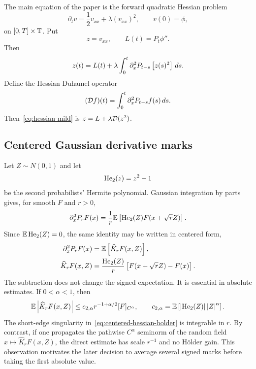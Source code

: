The main equation of the paper is the forward quadratic Hessian problem
\begin{equation}
  \partial_tv
  =
  \frac12v_{xx}+\lambda(v_{xx})^2,
  \qquad
  v(0)=\phi,
  \label{eq:hessian-forward}
\end{equation}
on $[0,T]\times\mathbb T$. Put
\begin{equation*}
  z=v_{xx},
  \qquad
  L(t)=P_t\phi''.
\end{equation*}
Then
\begin{equation}
  z(t)
  =
  L(t)
  +\lambda\int_0^t
  \partial_x^2P_{t-s}\left[z(s)^2\right]\,ds.
  \label{eq:hessian-mild}
\end{equation}
Define the Hessian Duhamel operator
\begin{equation}
  (\mathcal D f)(t)
  =
  \int_0^t\partial_x^2P_{t-s}f(s)\,ds.
  \label{eq:def-D}
\end{equation}
Then~\eqref{eq:hessian-mild} is $z=L+\lambda\mathcal D(z^2)$.

\subsection{Centered Gaussian derivative marks}

Let $Z\sim N(0,1)$ and let
\begin{equation*}
  \operatorname{He}_2(z)=z^2-1
\end{equation*}
be the second probabilists' Hermite polynomial. Gaussian integration by parts gives, for smooth $F$ and $r>0$,
\begin{equation}
  \partial_x^2P_rF(x)
  =
  \frac1r\mathbb E\left[\operatorname{He}_2(Z)F(x+\sqrt rZ)\right].
  \label{eq:gaussian-hessian-unsubtracted}
\end{equation}
Since $\mathbb E\operatorname{He}_2(Z)=0$, the same identity may be written in centered form,
\begin{align}
  \partial_x^2P_rF(x)
  &=
  \mathbb E\left[\widehat K_rF(x,Z)\right],
  \label{eq:centered-hessian-mark}\\
  \widehat K_rF(x,Z)
  &=
  \frac{\operatorname{He}_2(Z)}r
  \left[F(x+\sqrt rZ)-F(x)\right].
  \label{eq:centered-hessian-random-field}
\end{align}
The subtraction does not change the signed expectation. It is essential in absolute estimates. If $0<\alpha<1$, then
\begin{equation}
  \mathbb E\left|\widehat K_rF(x,Z)\right|
  \leq
  c_{2,\alpha}r^{-1+\alpha/2}[F]_{C^\alpha},
  \qquad
  c_{2,\alpha}
  =
  \mathbb E\left[\left|\operatorname{He}_2(Z)\right|\left|Z\right|^\alpha\right].
  \label{eq:centered-hessian-holder}
\end{equation}
The short-edge singularity in~\eqref{eq:centered-hessian-holder} is integrable in $r$. By contrast, if one propagates the pathwise $C^\alpha$ seminorm of the random field $x\mapsto\widehat K_rF(x,Z)$, the direct estimate has scale $r^{-1}$ and no H\"older gain. This observation motivates the later decision to average several signed marks before taking the first absolute value.

